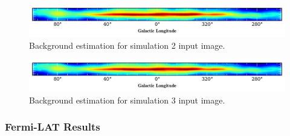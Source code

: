 \documentclass{PoS}
\begin{document}
\begin{figure}
  \begin{center}
      \includegraphics[width=\textwidth]{figures/BG_SIM2.pdf}
  \caption{Background estimation for simulation 2 input image.}
  \end{center}
\end{figure}

\begin{figure}
  \begin{center}
      \includegraphics[width=\textwidth]{figures/BG_SIM3.pdf}
  \caption{Background estimation for simulation 3 input image.}
  \end{center}
\end{figure}


\begin{table}
\centering
{}
\caption{Galactic plane fluxes for separated background images of the input simulation image catalogs.}
\end{table}

\subsubsection{Fermi-LAT Results}
\end{document}
